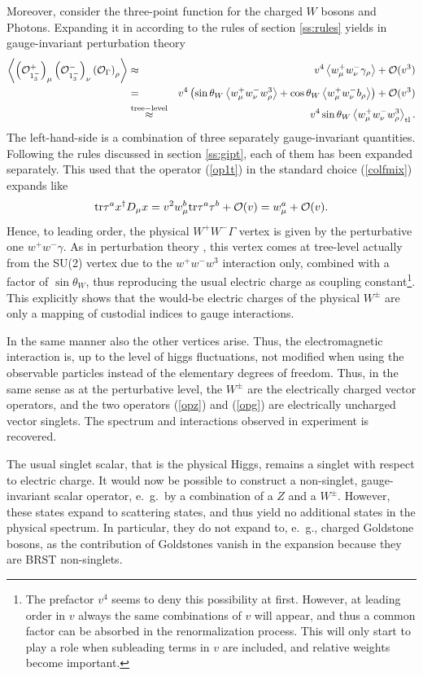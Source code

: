 \documentclass[final,twoside,12pt]{article}
\newcommand*{\no}{\noindent}
\newcommand*{\bea}{\begin{eqnarray}}
\newcommand*{\eea}{\end{eqnarray}}
\newcommand*{\be}{\begin{equation}}
\newcommand*{\ee}{\end{equation}}
\newcommand*{\pref}[1]{(\ref{#1})}
\newcommand*{\nn}{\nonumber}
\newcommand*{\tr}{\mathrm{tr}}
\newcommand*{\1}{1\!\!\!\bot}
\newcommand*{\la}{\left\langle}
\newcommand*{\ra}{\right\rangle}
\newcommand*{\op}{{\cal O}}
\begin{document}
Moreover, consider the three-point function for the charged $W$ bosons and Photons. Expanding it in according to the rules of section \ref{ss:rules} yields in gauge-invariant perturbation theory
\bea
\la\left(\op_{1_3^-}^+\right)_\mu\left(\op_{1_3^-}^-\right)_\nu\left(\op_\Gamma\right)_\rho\ra&\approx& v^4\la w_\mu^+w_\nu^-\gamma_\rho\ra+\op(v^3)\label{electric}\\
&=&v^4\left(\sin\theta_W\la w_\mu^+w_\nu^-w^3_\rho\ra+\cos\theta_W\la w_\mu^+w_\nu^-b_\rho\ra\right)+\op(v^3)\nn\\
&\stackrel{\mathrm{tree-level}}{\approx}&v^4\sin\theta_W\la w_\mu^+w_\nu^-w^3_\rho\ra_{\mathrm{tl}}\nn.
\eea
\no The left-hand-side is a combination of three separately gauge-invariant quantities. Following the rules discussed in section \ref{ss:gipt}, each of them has been expanded separately. This used that the operator \pref{op1t} in the standard choice \pref{colfmix} expands like
\be
\tr\tau^a x^\dagger D_\mu x=v^2w_\mu^b\tr\tau^a\tau^b+\op(v)=w_\mu^a+\op(v)\nn.
\ee
\no Hence, to leading order, the physical $W^+W^-\Gamma$ vertex is given by the perturbative one $w^+w^-\gamma$. As in perturbation theory \cite{Bohm:2001yx}, this vertex comes at tree-level actually from the SU(2) vertex due to the $w^+w^-w^3$ interaction only, combined with a factor of $\sin\theta_W$, thus reproducing the usual electric charge as coupling constant\footnote{The prefactor $v^4$ seems to deny this possibility at first. However, at leading order in $v$ always the same combinations of $v$ will appear, and thus a common factor can be absorbed in the renormalization process. This will only start to play a role when subleading terms in $v$ are included, and relative weights become important.}. This explicitly shows that the would-be electric charges of the physical $W^\pm$ are only a mapping of custodial indices to gauge interactions.

In the same manner also the other vertices arise. Thus, the electromagnetic interaction is, up to the level of higgs fluctuations, not modified when using the observable particles instead of the elementary degrees of freedom. Thus, in the same sense as at the perturbative level, the $W^\pm$ are the electrically charged vector operators, and the two operators \pref{opz} and \pref{opg} are electrically uncharged vector singlets. The spectrum and interactions observed in experiment is recovered.

The usual singlet scalar, that is the physical Higgs, remains a singlet with respect to electric charge. It would now be possible to construct a non-singlet, gauge-invariant scalar operator, e.\ g.\ by a combination of a $Z$ and a $W^\pm$. However, these states expand to scattering states, and thus yield no additional states in the physical spectrum. In particular, they do not expand to, e.\ g., charged Goldstone bosons, as the contribution of Goldstones vanish in the expansion because they are BRST non-singlets.
\end{document}
